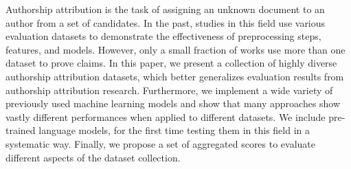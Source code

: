 Authorship attribution is the task of assigning an unknown document to an author from a set of candidates. In the past, studies in this field use various evaluation datasets to demonstrate the effectiveness of preprocessing steps, features, and models. However, only a small fraction of works use more than one dataset to prove claims. In this paper, we present a collection of highly diverse authorship attribution datasets, which better generalizes evaluation results from authorship attribution research. Furthermore, we implement a wide variety of previously used machine learning models and show that many approaches show vastly different performances when applied to different datasets. We include pre-trained language models, for the first time testing them in this field in a systematic way. Finally, we propose a set of aggregated scores to evaluate different aspects of the dataset collection.
